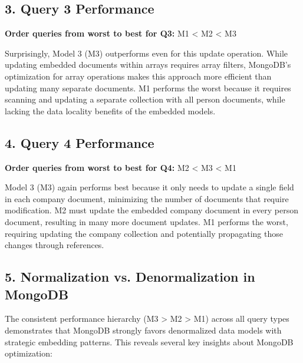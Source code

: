 \subsection*{3. Query 3 Performance}
\textbf{Order queries from worst to best for Q3:} M1 < M2 < M3

Surprisingly, Model 3 (M3) outperforms even for this update operation. While updating embedded documents within arrays requires array filters, MongoDB's optimization for array operations makes this approach more efficient than updating many separate documents. M1 performs the worst because it requires scanning and updating a separate collection with all person documents, while lacking the data locality benefits of the embedded models.

\subsection*{4. Query 4 Performance}
\textbf{Order queries from worst to best for Q4:} M2 < M3 < M1

Model 3 (M3) again performs best because it only needs to update a single field in each company document, minimizing the number of documents that require modification. M2 must update the embedded company document in every person document, resulting in many more document updates. M1 performs the worst, requiring updating the company collection and potentially propagating those changes through references.

\subsection*{5. Normalization vs. Denormalization in MongoDB}

The consistent performance hierarchy (M3 > M2 > M1) across all query types demonstrates that MongoDB strongly favors denormalized data models with strategic embedding patterns. This reveals several key insights about MongoDB optimization:

